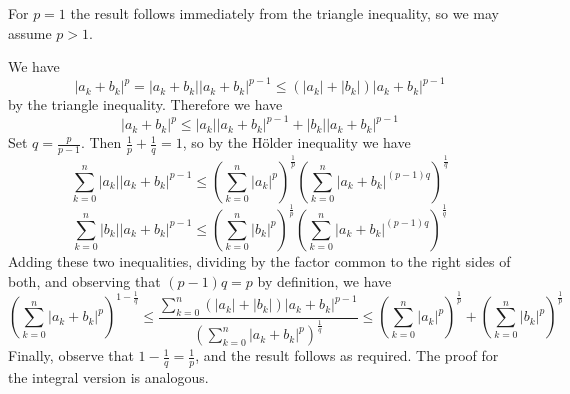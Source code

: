 \documentclass[12pt]{article}
\begin{document}
For $p=1$ the result follows immediately from the triangle inequality, so we may assume $p>1$.

We have 
\[ |a_k+b_k|^p=|a_k+b_k| |a_k+b_k|^{p-1} \leq (|a_k|+|b_k|)|a_k+b_k|^{p-1} \]
by the triangle inequality.  Therefore we have 
\[ |a_k+b_k|^p  \leq |a_k||a_k+b_k|^{p-1} + |b_k||a_k+b_k|^{p-1} \]
Set $q=\frac{p}{p-1}$.  Then $\frac{1}{p}+\frac{1}{q}=1$, so by the H\"older inequality we have 
\[ \sum_{k=0}^n |a_k||a_k+b_k|^{p-1} \leq
    \left( \sum_{k=0}^n |a_k|^p \right)^{\frac{1}{p}} 
    \left( \sum_{k=0}^n |a_k+b_k|^{(p-1)q} \right)^{\frac{1}{q}} \]
\[ \sum_{k=0}^n |b_k||a_k+b_k|^{p-1} \leq
    \left( \sum_{k=0}^n |b_k|^p \right)^{\frac{1}{p}} 
    \left( \sum_{k=0}^n |a_k+b_k|^{(p-1)q} \right)^{\frac{1}{q}} \]
Adding these two inequalities, dividing by the factor common to the right sides of both, and observing that $(p-1)q=p$ by definition, we have
\[ \left( \sum_{k=0}^n |a_k+b_k|^p \right)^{1-\frac{1}{q}}
   \leq \frac{ \sum_{k=0}^n (|a_k|+|b_k|)|a_k+b_k|^{p-1} }{ \left( \sum_{k=0}^n |a_k+b_k|^{p} \right)^{\frac{1}{q}} }
   \leq \left( \sum_{k=0}^n |a_k|^p \right)^{\frac{1}{p}} +
        \left( \sum_{k=0}^n |b_k|^p \right)^{\frac{1}{p}}  \]
Finally, observe that $1-\frac{1}{q}=\frac{1}{p}$, and the result follows as required.  The proof for the integral version is analogous.
\end{document}
